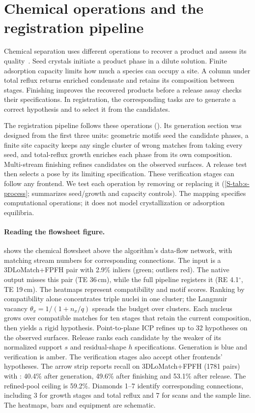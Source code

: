 \section{Chemical operations and the registration pipeline}
\label{S-sec:s-flowsheet}

Chemical separation uses different operations to recover a product and assess its quality~\cite{mccabe2005,mullin2001}. Seed crystals initiate a product phase in a dilute solution. Finite adsorption capacity limits how much a species can occupy a site. A column under total reflux returns enriched condensate and retains its composition between stages. Finishing improves the recovered products before a release assay checks their specifications. In registration, the corresponding tasks are to generate a correct hypothesis and to select it from the candidates.

The registration pipeline follows these operations (). Its generation section was designed from the first three units: geometric motifs seed the candidate phases, a finite site capacity keeps any single cluster of wrong matches from taking every seed, and total-reflux growth enriches each phase from its own composition. Multi-stream finishing refines candidates on the observed surfaces. A release test then selects a pose by its limiting specification. These verification stages can follow any frontend. We test each operation by removing or replacing it (\cref{S-tab:s-process};  summarizes seed/growth and capacity controls). The mapping specifies computational operations; it does not model crystallization or adsorption equilibria.

\paragraph{Reading the flowsheet figure.}  shows the chemical flowsheet above the algorithm's data-flow network, with matching stream numbers for corresponding connections. The input is a 3DLoMatch+FPFH pair with 2.9\% inliers (green; outliers red). The native \ls{} output misses this pair (TE 36\,cm), while the full pipeline registers it (RE 4.1$^\circ$, TE 19\,cm). The heatmaps represent compatibility and motif scores. Ranking by compatibility alone concentrates triple nuclei in one cluster; the Langmuir vacancy $\theta_x=1/(1+n_x/q)$ spreads the budget over clusters. Each nucleus grows over compatible matches for ten stages that retain the current composition, then yields a rigid hypothesis. Point-to-plane ICP refines up to 32 hypotheses on the observed surfaces. Release ranks each candidate by the weaker of its normalized support $s$ and residual-shape $h$ specifications. Generation is blue and verification is amber. The verification stages also accept other frontends' hypotheses. The arrow strip reports recall on 3DLoMatch+FPFH (1781 pairs) with \ls{}: 40.4\% after generation, 49.6\% after finishing and 53.1\% after release. The refined-pool ceiling is 59.2\%. Diamonds 1--7 identify corresponding connections, including 3 for growth stages and total reflux and 7 for scans and the sample line. The heatmaps, bars and equipment are schematic.

